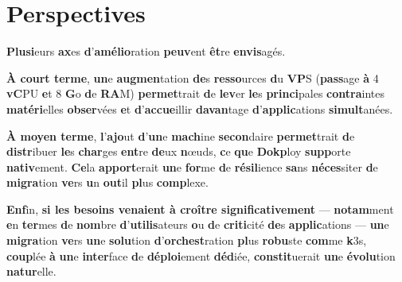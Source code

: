 \documentclass{rapportClass} %
\begin{document}



\section{Perspectives}

\textbf{Plusi}eurs \textbf{ax}es \textbf{d}'\textbf{amélio}ration \textbf{peuv}ent \textbf{êt}re \textbf{envis}agés.

\textbf{\textbf{À} \textbf{cou}rt \textbf{ter}me}, \textbf{un}e \textbf{augmen}tation \textbf{de}s \textbf{resso}urces \textbf{d}u \textbf{VP}S (\textbf{pass}age \textbf{à} 4
\textbf{vC}PU \textbf{e}t 8 \textbf{G}o \textbf{d}e \textbf{RA}M) \textbf{permet}trait \textbf{d}e \textbf{lev}er \textbf{le}s \textbf{princi}pales \textbf{contra}intes
\textbf{matéri}elles \textbf{obser}vées \textbf{e}t \textbf{d}'\textbf{accue}illir \textbf{davan}tage \textbf{d}'\textbf{applic}ations
\textbf{simult}anées.

\textbf{\textbf{À} \textbf{moy}en \textbf{ter}me}, \textbf{l}'\textbf{ajo}ut \textbf{d}'\textbf{un}e \textbf{mach}ine \textbf{secon}daire \textbf{permet}trait \textbf{d}e
\textbf{distr}ibuer \textbf{le}s \textbf{char}ges \textbf{ent}re \textbf{de}ux \textbf{n}œuds, \textbf{c}e \textbf{qu}e \textbf{Dokp}loy \textbf{supp}orte
\textbf{nativ}ement. \textbf{Ce}la \textbf{apport}erait \textbf{un}e \textbf{for}me \textbf{d}e \textbf{résil}ience \textbf{sa}ns \textbf{néces}siter
\textbf{d}e \textbf{migra}tion \textbf{ve}rs \textbf{u}n \textbf{out}il \textbf{pl}us \textbf{comp}lexe.

\textbf{Enf}in, \textbf{\textbf{s}i \textbf{le}s \textbf{beso}ins \textbf{vena}ient \textbf{à} \textbf{croî}tre \textbf{significa}tivement} — \textbf{notam}ment
\textbf{e}n \textbf{ter}mes \textbf{d}e \textbf{nom}bre \textbf{d}'\textbf{utilis}ateurs \textbf{o}u \textbf{d}e \textbf{criti}cité \textbf{de}s \textbf{applic}ations —
\textbf{un}e \textbf{migra}tion \textbf{ve}rs \textbf{un}e \textbf{solu}tion \textbf{d}'\textbf{orchest}ration \textbf{pl}us \textbf{robu}ste \textbf{com}me
\textbf{k}3s, \textbf{coup}lée \textbf{à} \textbf{un}e \textbf{inter}face \textbf{d}e \textbf{déploi}ement \textbf{déd}iée, \textbf{constit}uerait \textbf{un}e
\textbf{évolu}tion \textbf{natur}elle.
\end{document}
